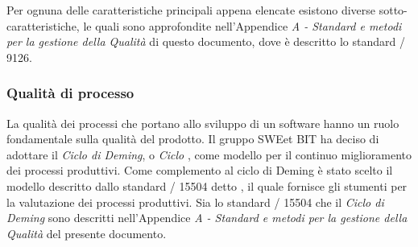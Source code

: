     Per ognuna delle caratteristiche principali appena elencate esistono diverse sotto-caratteristiche,
    le quali sono approfondite nell'Appendice \emph{A - Standard e metodi per la gestione della Qualità} di questo documento, dove è descritto lo standard / 9126.

    \subsubsection{Qualità di processo}
    La qualità dei processi che portano allo sviluppo di un software hanno un ruolo fondamentale sulla qualità del prodotto.
    Il gruppo SWEet BIT ha deciso di adottare il \emph{Ciclo di Deming}, o \emph{Ciclo} , come modello per il continuo miglioramento dei processi produttivi.
    Come complemento al ciclo di Deming è stato scelto il modello descritto dallo standard / 15504 detto ,
    il quale fornisce gli stumenti per la valutazione dei processi produttivi.
    Sia lo standard / 15504 che il \emph{Ciclo di Deming} sono descritti nell'Appendice \emph{A - Standard e metodi per la gestione della Qualità} del presente documento.


